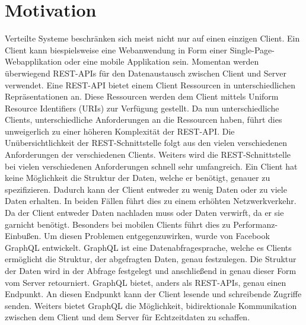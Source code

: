 \section{Motivation}
Verteilte Systeme beschränken sich meist nicht nur auf einen einzigen Client.
Ein Client kann biespielsweise eine Webanwendung in Form einer Single-Page-Webapplikation oder eine mobile Applikation sein.
Momentan werden überwiegend REST-APIs für den Datenaustausch zwischen Client und Server verwendet.
Eine REST-API bietet einem Client Ressourcen in unterschiedlichen Repräsentationen an.
Diese Ressourcen werden dem Client mittels Uniform Resource Identifiers (URIs) zur Verfügung gestellt.
Da nun unterschiedliche Clients, unterschiedliche Anforderungen an die Ressourcen haben, führt dies unweigerlich zu einer höheren Komplexität der REST-API.
Die Unübersichtlichkeit der REST-Schnittstelle folgt aus den vielen verschiedenen Anforderungen der verschiedenen Clients.
Weiters wird die REST-Schnittstelle bei vielen verschiedenen Anforderungen schnell sehr umfangreich.
Ein Client hat keine Möglichkeit die Struktur der Daten, welche er benötigt, genauer zu spezifizieren.
Dadurch kann der Client entweder zu wenig Daten oder zu viele Daten erhalten.
In beiden Fällen führt dies zu einem erhöhten Netzwerkverkehr.
Da der Client entweder Daten nachladen muss oder Daten verwirft, da er sie garnicht benötigt.
Besonders bei mobilen Clients führt dies zu Performanz-Einbußen.
Um diesen Problemen entgegenzuwirken, wurde von Facebook GraphQL entwickelt.
GraphQL ist eine Datenabfragesprache, welche es Clients ermöglicht die Struktur, der abgefragten Daten, genau festzulegen.
Die Struktur der Daten wird in der Abfrage festgelegt und anschließend in genau dieser Form vom Server retourniert.
GraphQL bietet, anders als REST-APIs, genau einen Endpunkt.
An diesen Endpunkt kann der Client lesende und schreibende Zugriffe senden.
Weiters bietet GraphQL die Möglichkeit, bidirektionale Kommunikation zwischen dem Client und dem Server für Echtzeitdaten zu schaffen.

